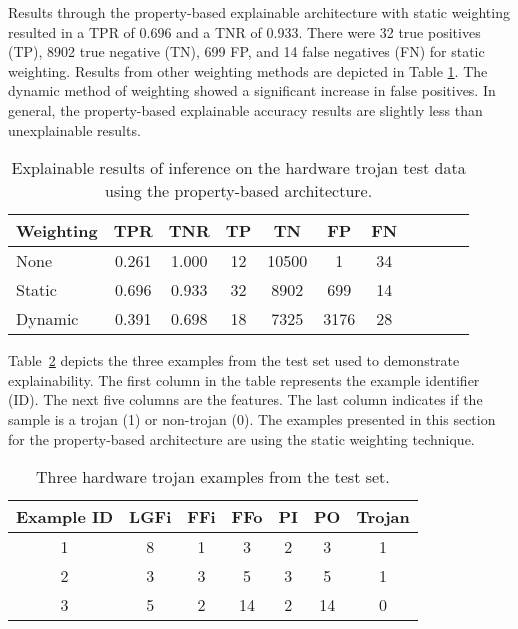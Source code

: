 Results through the property-based explainable architecture with static
weighting resulted in a TPR of 0.696 and a TNR of 0.933. There were 32 true
positives (TP), 8902 true negative (TN), 699 FP, and 14 false negatives (FN) for
static weighting. Results from other weighting methods are depicted in Table
\ref{tab_exp_weight_comp}.  The dynamic method of weighting showed a significant
increase in false positives. In general, the property-based explainable accuracy
results are slightly less than unexplainable results.

\begin{table}[H]
    \renewcommand{\arraystretch}{1.3}
    \centering
    \caption{Explainable results of inference on the hardware trojan test data using the property-based architecture.}
    \begin{tabular}{|l|c|c|c|c|c|c|c|c|c|c|}
        \hline
         Weighting &  TPR &  TNR &  TP &  TN &  FP &  FN \\
        \hline
        \hline
        None  & 0.261 & 1.000 & 12 & 10500 & 1 & 34 \\
        \hline
        Static & 0.696 & 0.933 & 32 & 8902 & 699 & 14 \\
        \hline
        Dynamic & 0.391 & 0.698 & 18 & 7325 & 3176 & 28 \\
        \hline
    \end{tabular}
    \label{tab_exp_weight_comp}
\end{table}


Table~\ref{tab_ex} depicts the three examples from the test set used to
demonstrate explainability. The first column in the table represents the example
identifier (ID). The next five columns are the features.  The last column
indicates if the sample is a trojan (1) or non-trojan (0). The examples
presented in this section for the property-based architecture are using the
static weighting technique.

\begin{table}[H]
    \renewcommand{\arraystretch}{1.3}
    \centering
    \caption{Three hardware trojan examples from the test set.}
    \begin{tabular}{|c|c|c|c|c|c|c|}
        \hline
         Example ID &  LGFi &  FFi &  FFo &  PI &  PO &  Trojan \\
        \hline
        \hline
        1 & 8 & 1 & 3 & 2 & 3 & 1 \\
        \hline
        2 & 3 & 3 & 5 & 3 & 5 & 1 \\
        \hline
        3 & 5 & 2 & 14 & 2 & 14 & 0 \\
        \hline
    \end{tabular}
    \label{tab_ex}
\end{table}

